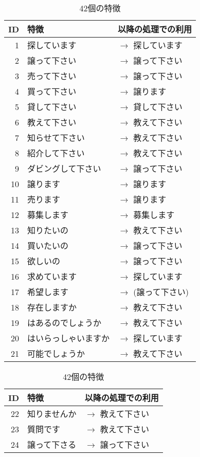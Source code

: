 \begin{table}
\caption{42個の特徴}
\label{table:features}
\begin{center}\footnotesize
\begin{tabular}{rll}
ID & 特徴        & 以降の処理での利用 \\ \hline
1 & 探しています & $\rightarrow$ 探しています \\
2 & 譲って下さい & $\rightarrow$ 譲って下さい \\ 
3 & 売って下さい & $\rightarrow$ 譲って下さい \\
4 & 買って下さい & $\rightarrow$ 譲ります \\
5 & 貸して下さい & $\rightarrow$ 貸して下さい \\
6 & 教えて下さい & $\rightarrow$ 教えて下さい \\
7 & 知らせて下さい & $\rightarrow$ 教えて下さい \\
8 & 紹介して下さい & $\rightarrow$ 教えて下さい \\
9 & ダビングして下さい & $\rightarrow$ 譲って下さい \\
10 & 譲ります & $\rightarrow$ 譲ります \\
11 & 売ります & $\rightarrow$ 譲ります \\
12 & 募集します & $\rightarrow$ 募集します \\
13 & 知りたいの & $\rightarrow$ 教えて下さい \\
14 & 買いたいの & $\rightarrow$ 譲って下さい \\
15 & 欲しいの   & $\rightarrow$ 譲って下さい \\
16 & 求めています & $\rightarrow$ 探しています \\
17 & 希望します   & $\rightarrow$ (譲って下さい) \\
18 & 存在しますか & $\rightarrow$ 教えて下さい \\
19 & はあるのでしょうか & $\rightarrow$ 教えて下さい \\
20 & はいらっしゃいますか & $\rightarrow$ 探しています \\
21 & 可能でしょうか & $\rightarrow$ 教えて下さい \\
\hline
\end{tabular}
\begin{tabular}{rll}
ID & 特徴        & 以降の処理での利用 \\ \hline
22 & 知りませんか & $\rightarrow$ 教えて下さい \\
23 & 質問です & $\rightarrow$ 教えて下さい \\
24 & 譲って下さる & $\rightarrow$ 譲って下さい \\

\end{tabular}
\end{center}
\end{table}
